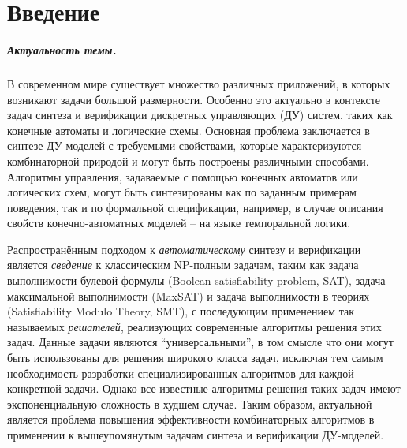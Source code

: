 \chapter*{Введение}                         %

\paragraph*{Актуальность темы.}
%
В современном мире существует множество различных приложений, в которых возникают задачи большой размерности.
Особенно это актуально в контексте задач синтеза и верификации дискретных управляющих (ДУ) систем, таких как конечные автоматы и логические схемы.
Основная проблема заключается в синтезе ДУ-моделей с требуемыми свойствами, которые характеризуются комбинаторной природой и могут быть построены различными способами.
Алгоритмы управления, задаваемые с помощью конечных автоматов или логических схем, могут быть синтезированы как по заданным примерам поведения, так и по формальной спецификации, например, в случае описания свойств конечно-автоматных моделей \--- на языке темпоральной логики.


Распространённым подходом к \emph{автоматическому} синтезу и верификации является \emph{сведение} к классическим NP-полным задачам, таким как задача выполнимости булевой формулы (Boolean satisfiability problem, SAT), задача максимальной выполнимости (MaxSAT) и задача выполнимости в теориях (Satisfiability Modulo Theory, SMT), с последующим применением так называемых \emph{решателей}, реализующих современные алгоритмы решения этих задач.
Данные задачи являются \enquote{универсальными}, в том смысле что они могут быть использованы для решения широкого класса задач, исключая тем самым необходимость разработки специализированных алгоритмов для каждой конкретной задачи.
Однако все известные алгоритмы решения таких задач имеют экспоненциальную сложность в худшем случае.
Таким образом, актуальной является проблема повышения эффективности комбинаторных алгоритмов в применении к вышеупомянутым задачам синтеза и верификации ДУ-моделей.


